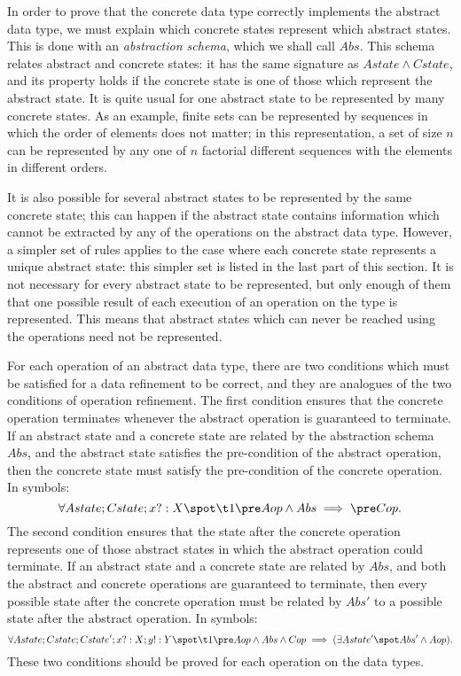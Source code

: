 In order to prove that the concrete data type correctly implements the
abstract data type, we must explain which concrete states
represent which abstract states.  This is done with an
{\em abstraction schema\/},%
which we shall call $Abs$. This schema relates abstract and concrete
states: it has the same signature as $Astate \land Cstate$, and its
property holds if the concrete state is one of those which represent
the abstract state.  It is quite usual for one abstract state to be
represented by many concrete states. As an example, finite sets can be
represented by sequences in which the order of elements does not
matter; in this representation, a set of size $n$ can be represented
by any one of $n$ factorial different sequences with the elements in
different orders.

It is also possible for several abstract states to be represented by
the same concrete state; this can happen if the abstract state
contains information which cannot be extracted by any of the
operations on the abstract data type. However, a simpler set of
rules applies to the case where each concrete state represents a
unique abstract state: this simpler set is listed in the last part of
this section.  It is not necessary for every abstract state to be
represented, but only enough of them that one possible result of
each execution of an operation on the type is represented.  This
means that abstract states which can never be reached using the
operations need not be represented.

\new For each operation of an abstract data type, there are two
conditions which must be satisfied for a data refinement to be
correct, and they are analogues of the two conditions of operation
refinement.  The first condition ensures that the concrete operation
terminates whenever the abstract operation is guaranteed to
terminate. If an abstract state and a concrete state are related by
the abstraction schema $Abs$, and the abstract state satisfies the
pre-condition of the abstract operation, then the concrete state must
satisfy the pre-condition of the concrete operation.  In symbols:
\[
	\forall Astate; Cstate; x?: X \spot \\
\t1		\pre Aop \land Abs \implies \pre Cop.
\]
The second condition ensures that the state after the concrete
operation represents one of those abstract states in which the
abstract operation could terminate.  If an abstract state and a
concrete state are related by $Abs$, and both the abstract and
concrete operations are guaranteed to terminate, then every possible
state after the concrete operation must be related by $Abs'$ to a
possible state after the abstract operation. In symbols:
\[
	\forall Astate; Cstate; Cstate'; x?: X; y!: Y \spot \\
\t1		\pre Aop \land Abs \land Cop \implies
			(\exists Astate' \spot Abs' \land Aop).
\]
These two conditions should be proved for each operation on the data
types.

